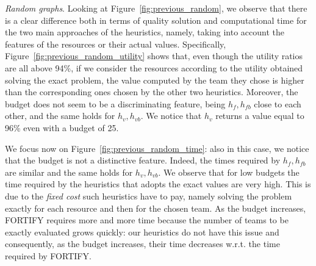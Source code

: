 \textit{Random graphs}. Looking at Figure~\ref{fig:previous_random}, we observe that there is a clear difference both in terms of quality solution and computational time for the two main approaches of the heuristics, namely, taking into account the features of the resources or their actual values. Specifically, Figure~\ref{fig:previous_random_utility} shows that, even though the utility ratios are all above 94\%, if we consider the resources according to the utility obtained solving the exact problem, the value computed by the team they chose is higher than the corresponding ones chosen by the other two heuristics. Moreover, the budget does not seem to be a discriminating feature, being $h_f, h_{fb}$ close to each other, and the same holds for $h_v, h_{vb}$. We notice that $h_v$ returns a value equal to 96\% even with a budget of 25.

We focus now on Figure~\ref{fig:previous_random_time}: also in this case, we notice that the budget is not a distinctive feature. Indeed, the times required by $h_f, h_{fb}$ are similar and the same holds for $h_v, h_{vb}$. We observe that for low budgets the time required by the heuristics that adopts the exact values are very high. This is due to the \textit{fixed cost} such heuristics have to pay, namely solving the problem exactly for each resource and then for the chosen team. As the budget increases, FORTIFY requires more and more time because the number of teams to be exactly evaluated grows quickly: our heuristics do not have this issue and consequently, as the budget increases, their time decreases w.r.t. the time required by FORTIFY.


